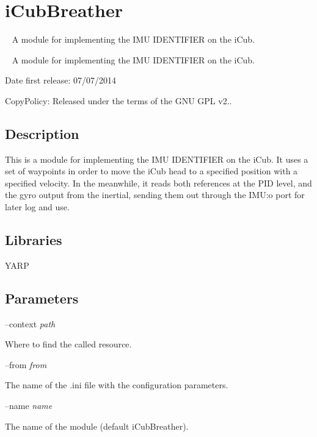 \section{i\+Cub\+Breather}
\label{group__icub__iCubBreather}


~\newline
 A module for implementing the I\+MU I\+D\+E\+N\+T\+I\+F\+I\+ER on the i\+Cub.  


~\newline
 A module for implementing the I\+MU I\+D\+E\+N\+T\+I\+F\+I\+ER on the i\+Cub. 

Date first release\+: 07/07/2014

Copy\+Policy\+: Released under the terms of the G\+NU G\+PL v2..\hypertarget{group__icub__iCubWriter_intro_sec}{}\subsection{Description}\label{group__icub__iCubWriter_intro_sec}
This is a module for implementing the I\+MU I\+D\+E\+N\+T\+I\+F\+I\+ER on the i\+Cub. It uses a set of waypoints in order to move the i\+Cub head to a specified position with a specified velocity. In the meanwhile, it reads both references at the P\+ID level, and the gyro output from the inertial, sending them out through the I\+MU\+:o port for later log and use.\hypertarget{group__icub__iCubWriter_lib_sec}{}\subsection{Libraries}\label{group__icub__iCubWriter_lib_sec}
Y\+A\+RP\hypertarget{group__icub__iCubWriter_parameters_sec}{}\subsection{Parameters}\label{group__icub__iCubWriter_parameters_sec}
--context {\itshape path} 
\begin{DoxyItemize}
\item Where to find the called resource.
\end{DoxyItemize}

--from {\itshape from} 
\begin{DoxyItemize}
\item The name of the .ini file with the configuration parameters.
\end{DoxyItemize}

--name {\itshape name} 
\begin{DoxyItemize}
\item The name of the module (default i\+Cub\+Breather).
\end{DoxyItemize}

